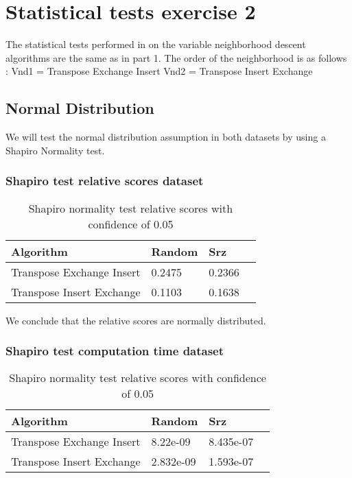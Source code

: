 \documentclass[]{article}
\begin{document}
	
	\section{Statistical tests exercise 2}
	The statistical tests performed in on the variable neighborhood descent algorithms are the same as in part 1.\newline
	The order of the neighborhood is as follows : \newline
	Vnd1 = Transpose Exchange Insert \newline
	Vnd2 = Transpose Insert Exchange 
	\newline
	\subsection{Normal Distribution}
	We will test the normal distribution assumption in both datasets by using a Shapiro Normality test.
	
	\subsubsection{Shapiro test relative scores dataset}
	\begin{table}[H]
		\centering
		\caption{Shapiro normality test relative scores with confidence of 0.05}
		\label{tab:table1}
		\begin{tabular}{l{|}lll}
			\toprule
			Algorithm & Random & Srz\\
			\midrule
			Transpose Exchange Insert &\color{Red}0.2475&\color{Red}0.2366\\ 
			Transpose Insert Exchange  &\color{Red}0.1103&\color{Red}0.1638\\ 
			\bottomrule
		\end{tabular}
	\end{table}
	
	
	We conclude that the relative scores are normally distributed.
	
	\subsubsection{Shapiro test computation time dataset}
	\begin{table}[H]
		\centering
		\caption{Shapiro normality test relative scores with confidence of 0.05}
		\label{tab:table1}
		\begin{tabular}{l{|}lll}
			\toprule
			Algorithm & Random & Srz\\
			\midrule
			Transpose Exchange Insert &\color{OliveGreen} 8.22e-09&\color{OliveGreen}8.435e-07\\ 
			Transpose Insert Exchange  &\color{OliveGreen}2.832e-09&\color{OliveGreen}1.593e-07\\ 
			\bottomrule
		\end{tabular}
	\end{table}
	
\end{document}
